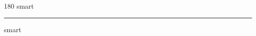 
\begin{frame}
\begin{center}
\begin{turn}{180}
{\fontsize{2.5cm}{1em}\selectfont smart}
\end{turn}
\vspace{1em}\par  
\hrule
\vspace{1em}\par  
{\fontsize{2.5cm}{1em}\selectfont smart}
\end{center}
\end{frame}
